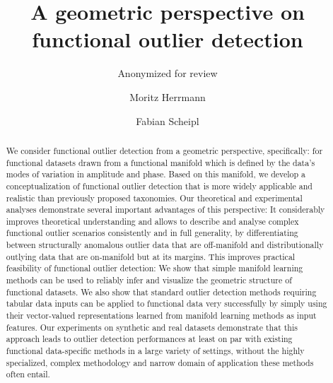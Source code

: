 \title{A geometric perspective on functional outlier detection}

%

\author{Anonymized for review}
\author{Moritz Herrmann \and Fabian Scheipl}



\maketitle

\begin{abstract}
We consider functional outlier detection from a geometric perspective, specifically: for functional datasets drawn from a functional manifold which is defined by the data's modes of variation in amplitude and phase.
Based on this manifold, we develop a conceptualization of functional outlier detection that is more widely applicable and realistic than previously proposed taxonomies.
Our theoretical and experimental analyses demonstrate several important advantages of this perspective:
It considerably improves theoretical understanding and allows to describe and analyse complex functional outlier scenarios consistently and in full generality, by differentiating between structurally anomalous outlier data that are off-manifold and distributionally outlying data that are on-manifold but at its margins.
This improves practical feasibility of functional outlier detection: We show that simple manifold learning methods can be used to reliably infer and visualize the geometric structure of functional datasets.
We also show that standard outlier detection methods requiring tabular data inputs can be applied to functional data very successfully by simply using their vector-valued representations learned from manifold learning methods as input features.
Our experiments on synthetic and real datasets demonstrate that this approach leads to outlier detection performances at least on par with existing functional data-specific methods in a large variety of settings, without the highly specialized, complex methodology and narrow domain of application these methods often entail.
\end{abstract}

